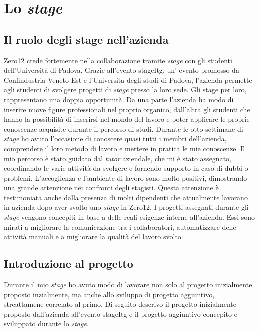 \chapter{Lo \textit{stage}}
\label{cap:lo-stage}



\section{Il ruolo degli stage nell'azienda}
Zero12 crede fortemente nella collaborazione tramite \textit{stage} con gli studenti dell'Università di Padova. Grazie all'evento \gls{stageItg}, un' evento promosso da Confindustria Veneto Est e l'Universita degli studi di Padova, l'azienda permette agli studenti di svolgere progetti di \textit{stage} presso la loro sede.
Gli stage per loro, rappresentano una doppia opportunità. Da una parte l’azienda ha modo di inserire nuove figure professionali nel proprio organico, dall’altra gli studenti che hanno la possibilità di inserirsi nel mondo del lavoro e poter applicare le proprie conoscenze acquisite durante il percorso di studi.
Durante le otto settimane di \textit{stage} ho avuto l’occasione di conoscere quasi tutti i membri dell’azienda, comprendere il loro metodo di lavoro e mettere in pratica le mie conoscenze. Il mio percorso è stato guidato dal \textit{tutor} aziendale, che mi è stato assegnato, coordinando le varie attività da svolgere e fornendo supporto in caso di dubbi o problemi. 
L'accoglienza e l'ambiente di lavoro sono molto positivi, dimostrando una grande attenzione nei confronti degli stagisti. 
Questa attenzione è testimoniata anche dalla presenza di molti dipendenti che attualmente lavorano in azienda dopo aver svolto uno \textit{stage} in Zero12.
I progetti assegnati durante gli \textit{stage} vengono concepiti in base a delle reali esigenze interne all’azienda. Essi sono mirati a migliorare la comunicazione tra i collaboratori, automatizzare delle attività manuali e a migliorare la qualità del lavoro svolto.

\section{Introduzione al progetto}
Durante il mio \textit{stage} ho avuto modo di lavorare non solo al progetto inizialmente proposto inzialmente, ma anche allo sviluppo di progetto aggiuntivo, streattamene correlato al primo.
Di seguito descrivo il progetto inizialmente proposto dall'azienda all'evento \gls{stageItg} e il progetto aggiuntivo concepito e sviluppato durante lo \textit{stage}.
